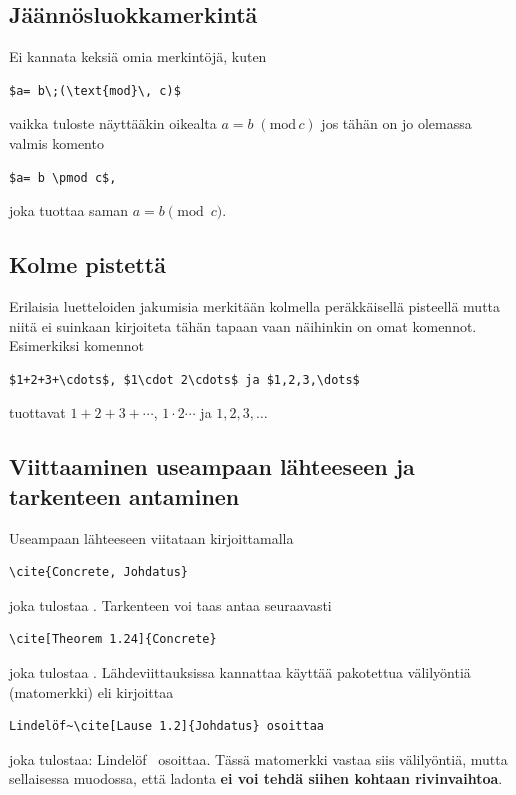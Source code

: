 \documentclass[a4paper,12 pt]{article}
\theoremstyle{plain}
\theoremstyle{definition}
\theoremstyle{remark}
\numberwithin{equation}{section}
\numberwithin{figure}{section}
\begin{document}
\subsection*{Jäännösluokkamerkintä}

Ei kannata keksiä omia merkintöjä, kuten

\begin{verbatim}
$a= b\;(\text{mod}\, c)$    
\end{verbatim}
vaikka tuloste näyttääkin oikealta $a= b\;(\text{mod}\, c)$ jos tähän on jo olemassa valmis komento

\begin{verbatim}
$a= b \pmod c$,    
\end{verbatim}
joka tuottaa saman $a= b \pmod c$.

\subsection*{Kolme pistettä}

Erilaisia luetteloiden jakumisia merkitään kolmella peräkkäisellä pisteellä mutta niitä ei suinkaan kirjoiteta tähän tapaan vaan näihinkin on omat komennot. Esimerkiksi komennot

\begin{verbatim}
$1+2+3+\cdots$, $1\cdot 2\cdots$ ja $1,2,3,\dots$    
\end{verbatim}
tuottavat $1+2+3+\cdots$, $1\cdot 2\cdots$ ja $1,2,3,\dots$ 

\subsection*{Viittaaminen useampaan lähteeseen ja tarkenteen antaminen}
Useampaan lähteeseen viitataan kirjoittamalla 

\begin{verbatim}
\cite{Concrete, Johdatus}    
\end{verbatim}
joka tulostaa \cite{Concrete, Johdatus}. Tarkenteen voi taas antaa seuraavasti

\begin{verbatim}
\cite[Theorem 1.24]{Concrete}    
\end{verbatim}
joka tulostaa \cite[Theorem 1.24]{Concrete}. Lähdeviittauksissa kannattaa käyttää pakotettua välilyöntiä (matomerkki) eli kirjoittaa

\begin{verbatim}
Lindelöf~\cite[Lause 1.2]{Johdatus} osoittaa    
\end{verbatim}
joka tulostaa: Lindelöf~\cite[Lause 1.2]{Johdatus} osoittaa. Tässä matomerkki vastaa siis välilyöntiä, mutta sellaisessa muodossa, että ladonta \textbf{ei voi tehdä siihen kohtaan rivinvaihtoa}.
\end{document}
